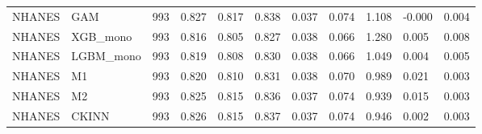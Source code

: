 \begin{table}[ht]
\begin{tabular}{lllllllllll}
NHANES & GAM & 993 & 0.827 & 0.817 & 0.838 & 0.037 & 0.074 & 1.108 & -0.000 & 0.004 \\
NHANES & XGB\_mono & 993 & 0.816 & 0.805 & 0.827 & 0.038 & 0.066 & 1.280 & 0.005 & 0.008 \\
NHANES & LGBM\_mono & 993 & 0.819 & 0.808 & 0.830 & 0.038 & 0.066 & 1.049 & 0.004 & 0.005 \\
NHANES & M1 & 993 & 0.820 & 0.810 & 0.831 & 0.038 & 0.070 & 0.989 & 0.021 & 0.003 \\
NHANES & M2 & 993 & 0.825 & 0.815 & 0.836 & 0.037 & 0.074 & 0.939 & 0.015 & 0.003 \\
NHANES & CKINN & 993 & 0.826 & 0.815 & 0.837 & 0.037 & 0.074 & 0.946 & 0.002 & 0.003 \\
\bottomrule
\end{tabular}
\end{table}
